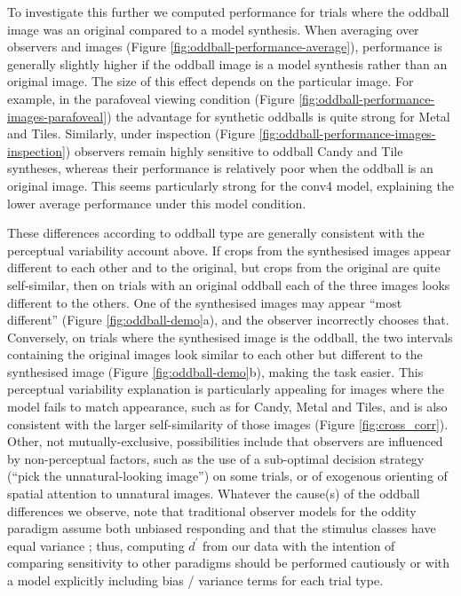 \documentclass[doc, 11pt,a4paper,natbib]{apa6}\usepackage[]{graphicx}\usepackage[]{color}
\begin{document}
To investigate this further we computed performance for trials where the oddball image was an original compared to a model synthesis.
When averaging over observers and images (Figure \ref{fig:oddball-performance-average}), performance is generally slightly higher if the oddball image is a model synthesis rather than an original image.
The size of this effect depends on the particular image.  
For example, in the parafoveal viewing condition (Figure \ref{fig:oddball-performance-images-parafoveal}) the advantage for synthetic oddballs is quite strong for Metal and Tiles.
Similarly, under inspection (Figure \ref{fig:oddball-performance-images-inspection}) observers remain highly sensitive to oddball Candy and Tile syntheses, whereas their performance is relatively poor when the oddball is an original image.
This seems particularly strong for the conv4 model, explaining the lower average performance under this model condition.

These differences according to oddball type are generally consistent with the perceptual variability account above.
If crops from the synthesised images appear different to each other and to the original, but crops from the original are quite self-similar, then on trials with an original oddball each of the three images looks different to the others.
One of the synthesised images may appear ``most different'' (Figure \ref{fig:oddball-demo}a), and the observer incorrectly chooses that.
Conversely, on trials where the synthesised image is the oddball, the two intervals containing the original images look similar to each other but different to the synthesised image (Figure \ref{fig:oddball-demo}b), making the task easier.
This perceptual variability explanation is particularly appealing for images where the model fails to match appearance, such as for Candy, Metal and Tiles, and is also consistent with the larger self-similarity of those images (Figure \ref{fig:cross_corr}).
Other, not mutually-exclusive, possibilities include that observers are influenced by non-perceptual factors, such as the use of a sub-optimal decision strategy (``pick the unnatural-looking image'') on some trials, or of exogenous orienting of spatial attention to unnatural images. 
Whatever the cause(s) of the oddball differences we observe, note that traditional observer models for the oddity paradigm assume both unbiased responding and that the stimulus classes have equal variance \citep[][p. 235]{macmillan_detection_2005}; thus, computing $d^\prime$ from our data with the intention of comparing sensitivity to other paradigms should be performed cautiously or with a model explicitly including bias / variance terms for each trial type.
\end{document}

